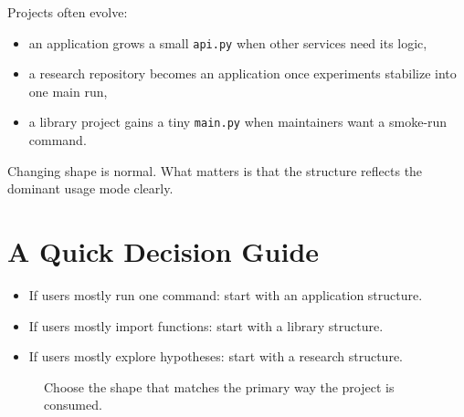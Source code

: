 \documentclass[11pt,oneside]{book}
\begin{document}
Projects often evolve:
\begin{itemize}
  \item an application grows a small \texttt{api.py} when other services need its logic,
  \item a research repository becomes an application once experiments stabilize into one main run,
  \item a library project gains a tiny \texttt{main.py} when maintainers want a smoke-run command.
\end{itemize}

Changing shape is normal.  
What matters is that the structure reflects the dominant usage mode clearly.

\section*{A Quick Decision Guide}

\begin{itemize}
  \item If users mostly run one command: start with an application structure.
  \item If users mostly import functions: start with a library structure.
  \item If users mostly explore hypotheses: start with a research structure.
\end{itemize}

\begin{figure}[H]
\centering
{}
\caption{Choose the shape that matches the primary way the project is consumed.}
\end{figure}
\end{document}
